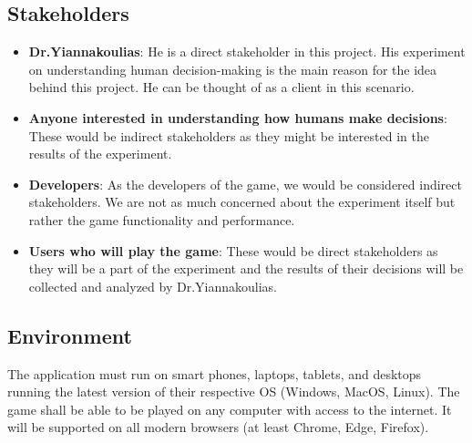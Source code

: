 \documentclass{article}
\begin{document}
\subsection{Stakeholders}
    \begin{itemize}
        \item \textbf{Dr.Yiannakoulias}: He is a direct stakeholder in this project. His experiment on understanding human decision-making is the main reason for the idea behind this project. He can be thought of as a client in this scenario.
        \item \textbf{Anyone interested in understanding how humans make decisions}: These would be indirect stakeholders as they might be interested in the results of the experiment.
        \item \textbf{Developers}: As the developers of the game, we would be considered indirect stakeholders. We are not as much concerned about the experiment itself but rather the game functionality and performance. 
        \item \textbf{Users who will play the game}: These would be direct stakeholders as they will be a part of the experiment and the results of their decisions will be collected and analyzed by Dr.Yiannakoulias.
    \end{itemize}

\subsection{Environment}
The application must run on smart phones, laptops, tablets, and desktops running the latest version of their respective OS (Windows, MacOS, Linux). The game shall be able to be played on any computer with access to the internet. It will be supported on all modern browsers (at least Chrome, Edge, Firefox).
\end{document}
